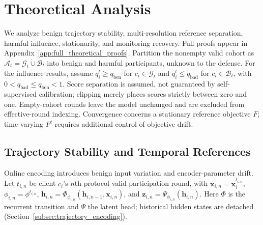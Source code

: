 \section{Theoretical Analysis}
\label{sec:theoretical_analysis}

We analyze benign trajectory stability, multi-resolution reference separation, harmful influence, stationarity, and monitoring recovery. Full proofs appear in Appendix~\ref{app:full_theoretical_proofs}. Partition the nonempty valid cohort as $\mathcal{A}_t=\mathcal{G}_t\mathbin{\dot\cup}\mathcal{B}_t$ into benign and harmful participants, unknown to the defense. For the influence results, assume $q_i^t\geq q_{\mathrm{ben}}$ for $c_i\in\mathcal{G}_t$ and $q_i^t\leq q_{\mathrm{bad}}$ for $c_i\in\mathcal{B}_t$, with $0<q_{\mathrm{bad}}\leq q_{\mathrm{ben}}<1$. Score separation is assumed, not guaranteed by self-supervised calibration; clipping merely places scores strictly between zero and one. Empty-cohort rounds leave the model unchanged and are excluded from effective-round indexing. Convergence concerns a stationary reference objective $F$; time-varying $F^t$ requires additional control of objective drift.

\subsection{Trajectory Stability and Temporal References}

Online encoding introduces benign input variation and encoder-parameter drift. Let $t_{i,n}$ be client $c_i$'s $n$th protocol-valid participation round, with $\mathbf{x}_{i,n}=\mathbf{x}_i^{t_{i,n}}$, $\phi_{i,n}=\phi^{t_{i,n}}$, $\mathbf{h}_{i,n}=\Phi_{\phi_{i,n}}(\mathbf{h}_{i,n-1},\mathbf{x}_{i,n})$, and $\mathbf{z}_{i,n}=\Psi_{\phi_{i,n}}(\mathbf{h}_{i,n})$. Here $\Phi$ is the recurrent transition and $\Psi$ the latent head; historical hidden states are detached (Section~\ref{subsec:trajectory_encoding}).

